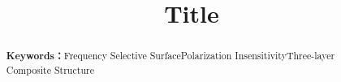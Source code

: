 \documentclass[withoutpreface,bwprint]{cumcmthesis}
\title{Title}
\begin{document}
 \maketitle
\renewcommand{\abstractname}{Abstract}
\renewcommand{\keywords}{\textbf{Keywords：}}
\begin{abstract}
\begin{spacing}{1.6}

\end{spacing}
\noindent\keywords{Frequency Selective Surface\quad Polarization Insensitivity\quad Three-layer Composite Structure}
\end{abstract}

\newpage
\tableofcontents
\newpage


 




\newpage
\begin{thebibliography}{99}
\end{thebibliography}

%
%
%

\newpage

\end{document}
